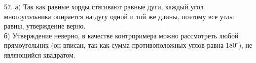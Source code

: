 57. а) Так как равные хорды стягивают равные дуги, каждый угол многоугольника опирается на дугу одной и той же длины, поэтому все углы равны, утверждение верно.\\
б) Утверждение неверно, в качестве контрпримера можно рассмотреть любой прямоугольник (он вписан, так как сумма противоположных углов равна $180^\circ$), не являющийся квадратом.\\
